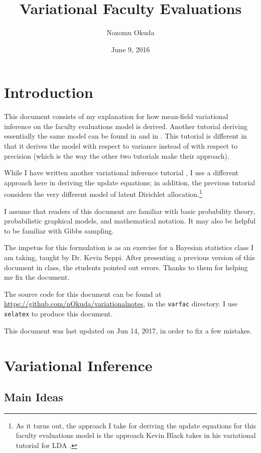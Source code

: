 \documentclass[12pt]{article}
\title{Variational Faculty Evaluations}
\author{Nozomu Okuda}
\date{June 9, 2016}
\begin{document}
\maketitle

\section{Introduction}

This document consists of my explanation for how mean-field variational
inference on the faculty evaluations model is derived.  Another tutorial
deriving essentially the same model can be found in \autocite{foxvartut} and in
\autocite{wikivar}.  This tutorial is different in that it derives the model
with respect to variance instead of with respect to precision (which is the way
the other two tutorials make their approach).

While I have written another variational inference tutorial \autocite{myvarlda},
I use a different approach here in deriving the update equations; in addition,
the previous tutorial considers the very different model of latent Dirichlet
allocation.\footnote{As it turns out, the approach I take for deriving the
update equations for this faculty evaluations model is the approach Kevin Black
takes in his variational tutorial for LDA \autocite{kb}.}

I assume that readers of this document are familiar with basic probability
theory, probabilistic graphical models, and mathematical notation.  It may also
be helpful to be familiar with Gibbs sampling.

The impetus for this formulation is as an exercise for a Bayesian statistics
class I am taking, taught by Dr. Kevin Seppi.  After presenting a previous
version of this document in class, the students pointed out errors.  Thanks to
them for helping me fix the document.

The source code for this document can be found at
\url{https://github.com/nOkuda/variationalnotes}, in the \texttt{varfac}
directory.  I use \texttt{xelatex} to produce this document.

This document was last updated on Jun 14, 2017, in order to fix a few mistakes.

\section{Variational Inference}

\subsection{Main Ideas}
\end{document}

